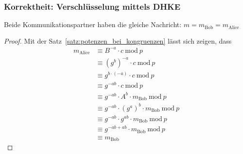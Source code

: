 \documentclass[
  a4paper,
  11pt,
]{scrartcl}
\theoremstyle{plain}
\theoremstyle{definition}
\theoremstyle{remark}
\newcommand{\Mod}[1]{\ \mathrm{mod}\ #1}
\begin{document}
\subsubsection{Korrektheit: Verschlüsselung mittels DHKE}
\label{sub:enc_with_dhke_proof}
Beide Kommunikationspartner haben die gleiche Nachricht: $m = m_{\text{Bob}} =
m_{\text{Alice}}$
\begin{proof}
	Mit der Satz~\ref{satz:potenzen_bei_kongruenzen} lässt sich zeigen, dass
	\begin{align*}
      m_{\text{Alice}} & \equiv B^{-a} \cdot c \Mod{p}\\
      & \equiv (g^b)^{-a} \cdot c \Mod{p}\\
      & \equiv g^{b \cdot (-a)} \cdot c \Mod{p}\\
      & \equiv g^{-ab} \cdot c \Mod{p}\\
      & \equiv g^{-ab} \cdot A^b \cdot m_{\text{Bob}} \Mod{p}\\
      & \equiv g^{-ab} \cdot (g^a)^b \cdot m_{\text{Bob}} \Mod{p}\\
      & \equiv g^{-ab} \cdot g^{ab} \cdot m_{\text{Bob}} \Mod{p}\\
      & \equiv g^{-ab+ab} \cdot m_{\text{Bob}} \Mod{p}\\
      & \equiv m_{\text{Bob}}
    \end{align*}
\end{proof}
\end{document}
